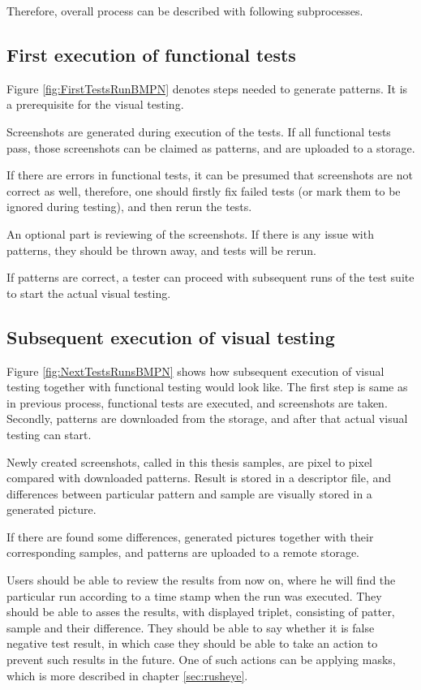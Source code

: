 \documentclass[11pt,oneside,final]{fithesis2}
\begin{document}
  Therefore, overall process can be described with following subprocesses.
  
  \subsection{First execution of functional tests}
  \label{chap:firstRunProc}
  
  Figure \ref{fig:FirstTestsRunBMPN} denotes steps needed to generate patterns. It is a prerequisite for the visual testing.
  
  Screenshots are generated during execution of the tests. If all functional tests pass, those screenshots
  can be claimed as patterns, and are uploaded to a storage. 
  
  If there are errors in functional tests, it can be presumed that screenshots are not correct as well, therefore, one should
  firstly fix failed tests (or mark them to be ignored during testing), and then rerun the tests.
  
  An optional part is reviewing of the screenshots. If there is any issue with patterns, they should be thrown away, and tests will be rerun.
  
  If patterns are correct, a tester can proceed with subsequent runs of the test suite to start the actual visual testing.
  
  \subsection{Subsequent execution of visual testing}
  
  Figure \ref{fig:NextTestsRunsBMPN} shows how subsequent execution of visual testing together with functional testing would look like. The first step is same as in previous process,
  functional tests are executed, and screenshots are taken. Secondly, patterns are downloaded from the storage, and after that actual visual testing can start.
  
  Newly created screenshots, called in this thesis samples, are pixel to pixel compared with downloaded patterns. Result is stored in a descriptor file, and differences between particular
  pattern and sample are visually stored in a generated picture.
  
  If there are found some differences, generated pictures together with their corresponding samples, and patterns are uploaded to a remote storage.
  
  Users should be able to review the results from now on, where he will find the particular run according to a time stamp when the run was executed. They should be able to asses the results,
  with displayed triplet, consisting of patter, sample and their difference. They should be able to say whether it is false negative test result, in which case they should be able to 
  take an action to prevent such results in the future. One of such actions can be applying masks, which is more described in chapter \ref{sec:rusheye}.
  
\end{document}
